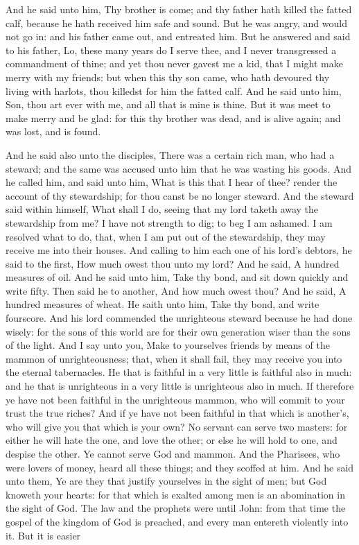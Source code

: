 And he said unto him, Thy brother is come; and thy father hath killed the fatted calf, because he hath received him safe and sound. But he was angry, and would not go in: and his father came out, and entreated him. But he answered and said to his father, Lo, these many years do I serve thee, and I never transgressed a commandment of thine; and yet thou never gavest me a kid, that I might make merry with my friends: but when this thy son came, who hath devoured thy living with harlots, thou killedst for him the fatted calf. And he said unto him, Son, thou art ever with me, and all that is mine is thine. But it was meet to make merry and be glad: for this thy brother was dead, and is alive again; and was lost, and is found. 

And he said also unto the disciples, There was a certain rich man, who had a steward; and the same was accused unto him that he was wasting his goods. And he called him, and said unto him, What is this that I hear of thee? render the account of thy stewardship; for thou canst be no longer steward. And the steward said within himself, What shall I do, seeing that my lord taketh away the stewardship from me? I have not strength to dig; to beg I am ashamed. I am resolved what to do, that, when I am put out of the stewardship, they may receive me into their houses. And calling to him each one of his lord’s debtors, he said to the first, How much owest thou unto my lord? And he said, A hundred measures of oil. And he said unto him, Take thy bond, and sit down quickly and write fifty. Then said he to another, And how much owest thou? And he said, A hundred measures of wheat. He saith unto him, Take thy bond, and write fourscore. And his lord commended the unrighteous steward because he had done wisely: for the sons of this world are for their own generation wiser than the sons of the light. And I say unto you, Make to yourselves friends by means of the mammon of unrighteousness; that, when it shall fail, they may receive you into the eternal tabernacles. He that is faithful in a very little is faithful also in much: and he that is unrighteous in a very little is unrighteous also in much. If therefore ye have not been faithful in the unrighteous mammon, who will commit to your trust the true riches? And if ye have not been faithful in that which is another’s, who will give you that which is your own? No servant can serve two masters: for either he will hate the one, and love the other; or else he will hold to one, and despise the other. Ye cannot serve God and mammon.  And the Pharisees, who were lovers of money, heard all these things; and they scoffed at him. And he said unto them, Ye are they that justify yourselves in the sight of men; but God knoweth your hearts: for that which is exalted among men is an abomination in the sight of God. The law and the prophets were until John: from that time the gospel of the kingdom of God is preached, and every man entereth violently into it. But it is easier 